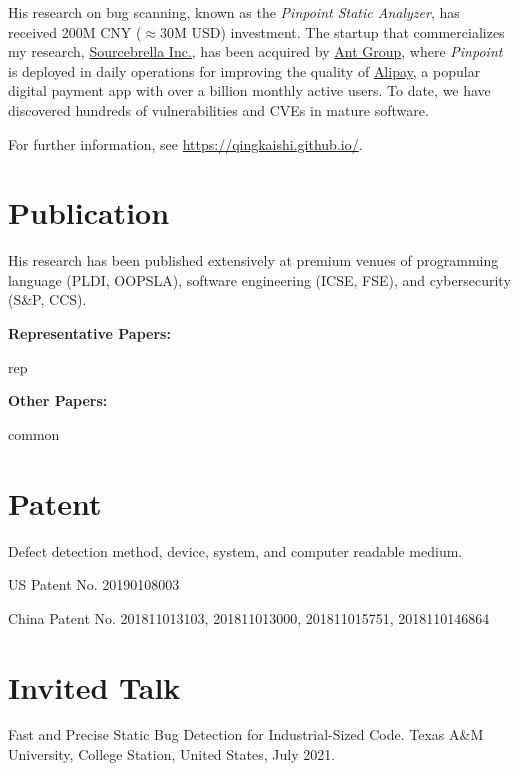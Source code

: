 \documentclass[a4paper,11pt]{article}
\begin{document}
His research on bug scanning, known as the \textit{Pinpoint Static Analyzer}, has received 200M CNY ($\approx 30$M USD) investment. The startup that commercializes my research, \href{https://www.sourcebrella.com/}{Sourcebrella Inc.}, has been acquired by \href{https://www.antgroup.com/en}{Ant Group}, where \textit{Pinpoint} is deployed in daily operations for improving the quality of \href{https://global.alipay.com/platform/site/ihome}{Alipay}, a popular digital payment app with over a billion monthly active users. To date, we have discovered hundreds of vulnerabilities and CVEs in mature software.
\vspace{0.3cm}

{For further information, see \href{https://qingkaishi.github.io/}{https://qingkaishi.github.io/}.}


\section{Publication}

{His research has been published extensively at premium venues of programming language (PLDI, OOPSLA), software engineering (ICSE, FSE), and cybersecurity (S\&P, CCS).}
\vspace{0.3cm}

\textbf{{Representative Papers:}}
\vspace{0.3cm}

\begin{bibenum}
{{rep}}
\end{bibenum}
\vspace{0.6cm}

\textbf{{Other Papers:}}
\vspace{0.3cm}
\begin{bibenum}
{{common}}
\end{bibenum}
\vspace{0.3cm}

\section{Patent}
Defect detection method, device, system, and computer readable medium.
\begin{innerlist}
    \item US Patent No. 20190108003
    \item China Patent No. 201811013103,  201811013000,  201811015751, 2018110146864
\end{innerlist}

\section{Invited Talk}
Fast and Precise Static Bug Detection for Industrial-Sized Code. Texas A\&M University, College Station, United States, July 2021.
\vspace{0.2cm}
\end{document}
